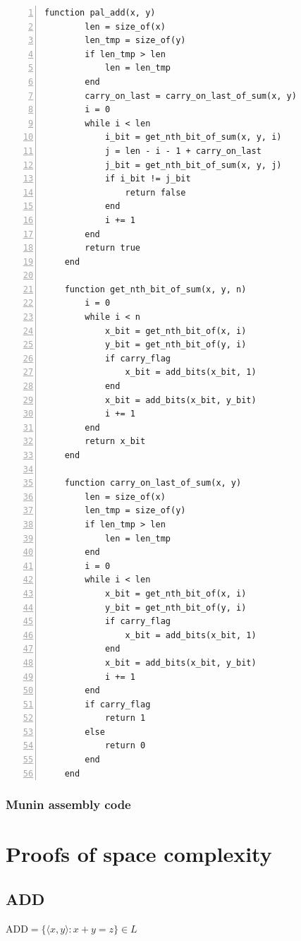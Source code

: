 \documentclass[11pt, a4paper]{article}
\begin{document}
\begin{lstlisting}[numbers=left]
    function pal_add(x, y)
        len = size_of(x)
        len_tmp = size_of(y)
        if len_tmp > len
            len = len_tmp
        end
        carry_on_last = carry_on_last_of_sum(x, y)
        i = 0
        while i < len
            i_bit = get_nth_bit_of_sum(x, y, i)
            j = len - i - 1 + carry_on_last
            j_bit = get_nth_bit_of_sum(x, y, j)
            if i_bit != j_bit
                return false
            end
            i += 1
        end
        return true
    end

    function get_nth_bit_of_sum(x, y, n)
        i = 0
        while i < n
            x_bit = get_nth_bit_of(x, i)
            y_bit = get_nth_bit_of(y, i)
            if carry_flag
                x_bit = add_bits(x_bit, 1)
            end
            x_bit = add_bits(x_bit, y_bit)
            i += 1
        end
        return x_bit
    end

    function carry_on_last_of_sum(x, y)
        len = size_of(x)
        len_tmp = size_of(y)
        if len_tmp > len
            len = len_tmp
        end
        i = 0
        while i < len
            x_bit = get_nth_bit_of(x, i)
            y_bit = get_nth_bit_of(y, i)
            if carry_flag
                x_bit = add_bits(x_bit, 1)
            end
            x_bit = add_bits(x_bit, y_bit)
            i += 1
        end
        if carry_flag
            return 1
        else
            return 0
        end
    end
\end{lstlisting}

\subsubsection{Munin assembly code}



\newpage

\section{Proofs of space complexity}\label{app:proofs}

\subsection{ADD}

\begin{theorem} \label{thrm:add}
    \(\text{ADD} = \{\langle x, y \rangle : x + y = z\} \in L\)
\end{theorem}
\end{document}
